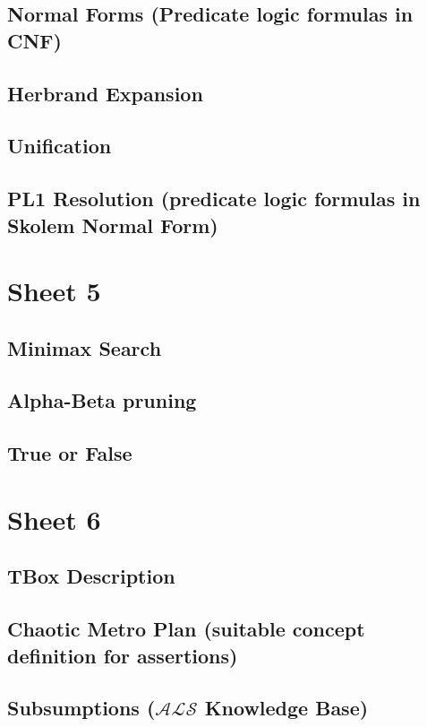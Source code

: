 \documentclass{article}
\begin{document}
    \subsection{Normal Forms (Predicate logic formulas in CNF)}
    \subsection{Herbrand Expansion}
    \subsection{Unification}
    \subsection{PL1 Resolution (predicate logic formulas in Skolem Normal Form)}
    

\section{Sheet 5}
    \subsection{Minimax Search}
    \subsection{Alpha-Beta pruning}
    \subsection{True or False}
    

\section{Sheet 6}
    \subsection{TBox Description}
    \subsection{Chaotic Metro Plan (suitable concept definition for assertions)}
    \subsection{Subsumptions ($\mathcal{ALS}$ Knowledge Base)}
    
\end{document}
